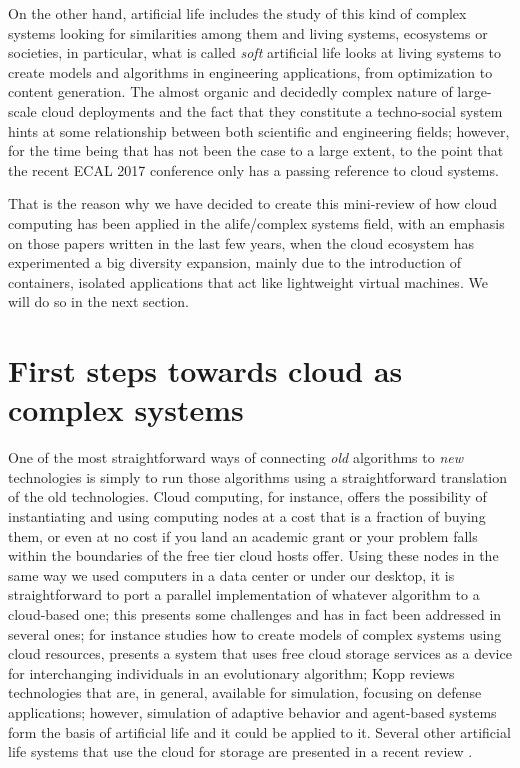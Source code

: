 \documentclass[utf8]{frontiersSCNS} %
\begin{document}
On the other hand, artificial life \citep{wiki:alife} includes the
study of this kind of complex systems looking for similarities among
them and living systems, ecosystems or societies, in particular, what
is called {\em soft} artificial life looks at living systems to create
models and algorithms in engineering applications, from optimization
to content generation. The almost organic and decidedly complex nature
of large-scale cloud deployments and the fact that they constitute a
techno-social system \citep{vespignani2009predicting,JJ2016} hints at some relationship between both scientific and engineering fields; however,
for the time being that has not been the case to a large extent, to the point
that the recent ECAL 2017 conference \citep{ecal17} only has a passing reference to cloud systems.

That is the reason why we have decided to create this
mini-review of how cloud computing has been applied in the
alife/complex systems field, with an emphasis on those papers written
in the last few years, when the cloud ecosystem has experimented a big
diversity expansion, mainly due to the introduction of containers,
isolated applications that act like lightweight virtual machines. We
will do so in the next section.

\section{First steps towards cloud as complex systems}

One of the most straightforward ways of connecting {\em old} algorithms to
{\em new} technologies is simply to run those algorithms using a
straightforward translation of the old technologies. Cloud computing,
for instance, offers the possibility of instantiating and using computing nodes
at a cost that is a fraction of buying them, or even at no cost if you
land an academic grant or your problem falls within the boundaries of
the free tier cloud hosts offer. Using these nodes in the same way we
used computers in a data center or under our desktop, it is
straightforward to port a parallel implementation of
whatever algorithm to a cloud-based one; this presents some challenges and
has in fact been addressed in several ones; for instance \citep{Medel2017}
studies how to create models of complex systems using cloud resources,
 \citep{merelo2011evostar} presents a system that uses free cloud
storage services as a device for interchanging individuals in an
evolutionary algorithm; Kopp \citep{Kopp2016} reviews technologies
that are, in general, available for simulation, focusing on defense
applications; however, simulation of adaptive behavior and agent-based
systems form the basis of artificial life and it could be applied to
it. Several other artificial life systems that use
the cloud for storage are presented in a recent review
\citep{taylor2016webal}.
\end{document}
